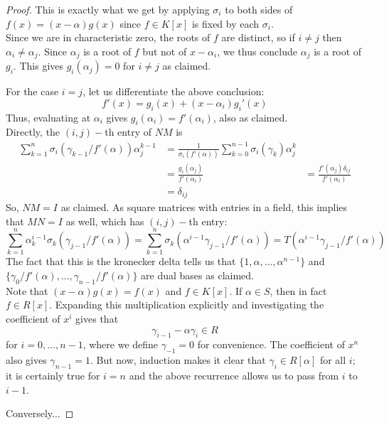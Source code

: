 \begin{proof}
	This is exactly what we get by applying $\sigma_i$ to both sides of $f(x) = (x-\alpha)g(x)$ since $f \in K[x]$ is fixed by each $\sigma_i$. \\
	
	Since we are in characteristic zero, the roots of $f$ are distinct, so if $i \neq j$ then $\alpha_i \neq \alpha_j$. Since $\alpha_j$ is a root of $f$ but not of $x-\alpha_i$, we thus conclude $\alpha_j$ is a root of $g_i$. This gives $g_i(\alpha_j) = 0$ for $i \neq j$ as claimed.
	
	For the case $i=j$, let us differentiate the above conclusion:
	\[ f'(x) = g_i(x) + (x-\alpha_i)g_i'(x) \]
	Thus, evaluating at $\alpha_i$ gives $g_i(\alpha_i) = f'(\alpha_i)$, also as claimed. \\
	
	Directly, the $(i,j)-$th entry of $NM$ is
	\begin{align*}
	\sum_{k=1}^n \sigma_i(\gamma_{k-1}/f'(\alpha))\alpha_j^{k-1}
		&= \frac{1}{\sigma_i(f'(\alpha))}\sum_{k=0}^{n-1} \sigma_i(\gamma_k)\alpha_j^k \\
		&= \frac{g_i(\alpha_j)}{f'(\alpha_i)}
		&= \frac{f'(\alpha_j)\delta_{ij}}{f'(\alpha_i)} \\
		&= \delta_{ij}
	\end{align*}
	So, $NM = I$ as claimed. As square matrices with entries in a field, this implies that $MN = I$ as well, which has $(i,j)-$th entry:
	\[ \sum_{k=1}^n \alpha_k^{i-1}\sigma_k(\gamma_{j-1}/f'(\alpha)) = \sum_{k=1}^n \sigma_k(\alpha^{i-1}\gamma_{j-1}/f'(\alpha)) = T(\alpha^{i-1}\gamma_{j-1}/f'(\alpha)) \]
	The fact that this is the kronecker delta tells us that $\{1,\alpha,\ldots,\alpha^{n-1}\}$ and $\{\gamma_0/f'(\alpha),\ldots,\gamma_{n-1}/f'(\alpha)\}$ are dual bases as claimed. \\
	
	Note that $(x-\alpha)g(x) = f(x)$ and $f \in K[x]$. If $\alpha \in S$, then in fact $f \in R[x]$. Expanding this multiplication explicitly and investigating the coefficient of $x^i$ gives that
	\[ \gamma_{i-1}-\alpha\gamma_i \in R \]
	for $i=0,\ldots,n-1$, where we define $\gamma_{-1} = 0$ for convenience. The coefficient of $x^n$ also gives $\gamma_{n-1} = 1$. But now, induction makes it clear that $\gamma_i \in R[\alpha]$ for all $i$; it is certainly true for $i=n$ and the above recurrence allows us to pass from $i$ to $i-1$.
	
	Conversely...
\end{proof}
